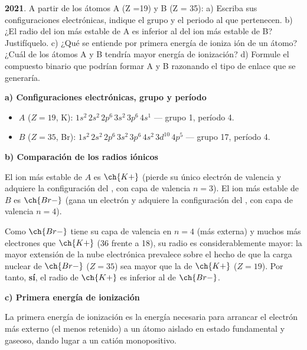 \begin{exerciseEVAU}
    \textbf{2021}.
    A partir de los átomos A (Z =19) y B (Z = 35): a) Escriba sus configuraciones electrónicas, indique el grupo y el periodo al que pertenecen. b) ¿El radio del ion más estable de A es inferior al del ion más estable de B? Justifíquelo. c) ¿Qué se entiende por primera energía de ioniza ión de un átomo? ¿Cuál de los átomos A y B tendría mayor energía de ionización? d) Formule el compuesto binario que podrían formar A y B razonando el tipo de enlace que se generaría.

    \begin{solu}

        \textbf{a) Configuraciones electrónicas, grupo y período}

        \begin{itemize}
            \item \(A\) (\(Z=19\), K): \(1s^2\,2s^2\,2p^6\,3s^2\,3p^6\,4s^1\) — grupo 1, período 4.
            \item \(B\) (\(Z=35\), Br): \(1s^2\,2s^2\,2p^6\,3s^2\,3p^6\,4s^2\,3d^{10}\,4p^5\) — grupo 17, período 4.
        \end{itemize}

        \textbf{b) Comparación de los radios iónicos}

        El ion más estable de \(A\) es \(\ch{K+}\) (pierde su único electrón de valencia y adquiere la configuración del , con capa de valencia \(n=3\)). El ion más estable de \(B\) es \(\ch{Br-}\) (gana un electrón y adquiere la configuración del , con capa de valencia \(n=4\)).

        Como \(\ch{Br-}\) tiene su capa de valencia en \(n=4\) (más externa) y muchos más electrones que \(\ch{K+}\) (36 frente a 18), su radio es considerablemente mayor: la mayor extensión de la nube electrónica prevalece sobre el hecho de que la carga nuclear de \(\ch{Br-}\) (\(Z=35\)) sea mayor que la de \(\ch{K+}\) (\(Z=19\)). Por tanto, \textbf{sí}, el radio de \(\ch{K+}\) es inferior al de \(\ch{Br-}\).

        \textbf{c) Primera energía de ionización}

        La primera energía de ionización es la energía necesaria para arrancar el electrón más externo (el menos retenido) a un átomo aislado en estado fundamental y gaseoso, dando lugar a un catión monopositivo.


\end{solu}
\end{exerciseEVAU}
